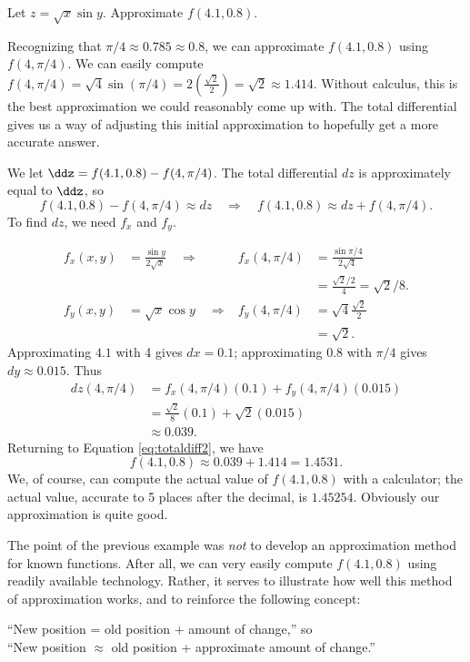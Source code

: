 {Let $z = \sqrt{x}\sin y$. Approximate $f(4.1,0.8)$.}
{Recognizing that $\pi/4 \approx 0.785\approx 0.8$, we can approximate $f(4.1,0.8)$ using $f(4,\pi/4)$. We can easily compute $f(4,\pi/4) = \sqrt{4}\sin(\pi/4) = 2\left(\frac{\sqrt{2}}2\right) = \sqrt{2}\approx 1.414.$ Without calculus, this is the best approximation we could reasonably come up with. The total differential gives us a way of adjusting this initial approximation to hopefully get a more accurate answer.

We let $\ddz = f(4.1,0.8) - f(4,\pi/4)$. The total differential $dz$ is approximately equal to $\ddz$, so
\begin{equation}f(4.1,0.8) - f(4,\pi/4) \approx dz \quad \Rightarrow \quad f(4.1,0.8) \approx dz + f(4,\pi/4).\label{eq:totaldiff2}\end{equation}
To find $dz$, we need $f_x$ and $f_y$.

\begin{align*}
f_x(x,y) &= \frac{\sin y}{2\sqrt{x}} \quad\Rightarrow&
f_x(4,\pi/4) &= \frac{\sin \pi/4}{2\sqrt{4}} \\
						& &&= \frac{\sqrt{2}/2}{4} = \sqrt{2}/8.\\
f_y(x,y) &= \sqrt{x}\cos y \quad\Rightarrow&
f_y(4,\pi/4) &= \sqrt{4}\frac{\sqrt{2}}2\\
		& & &= \sqrt{2}.
\end{align*}
Approximating $4.1$ with 4 gives $dx = 0.1$; approximating $0.8$ with $\pi/4$ gives $dy \approx 0.015$. Thus
\begin{align*}
dz(4,\pi/4) &=  f_x(4,\pi/4)(0.1) + f_y(4,\pi/4)(0.015)\\
				&= \frac{\sqrt{2}}8(0.1) + \sqrt{2}(0.015)\\
				&\approx 0.039.
\end{align*}
Returning to Equation \eqref{eq:totaldiff2}, we have
$$f(4.1,0.8) \approx 0.039 + 1.414 = 1.4531.$$
We, of course, can compute the actual value of $f(4.1,0.8)$ with a calculator; the actual value, accurate to 5 places after the decimal, is $1.45254$. Obviously our approximation is quite good.}

The point of the previous example was \textit{not} to develop an approximation method for known functions. After all, we can very easily compute $f(4.1,0.8)$ using readily available technology. Rather, it serves to illustrate how well this method of approximation works, and to reinforce the following concept:
\begin{center}
	``New position = old position $+$ amount of change,'' so\\
	``New position $\approx$ old position + approximate amount of change.''
\end{center}

